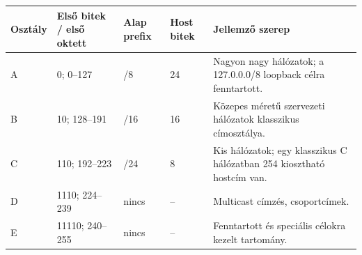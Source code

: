 \begin{tabularx}{\textwidth}{L{13mm}L{29mm}L{21mm}L{19mm}X}
\toprule
\textbf{Osztály} & \textbf{Első bitek / első oktett} & \textbf{Alap prefix} & \textbf{Host bitek} & \textbf{Jellemző szerep} \\
\midrule
A & 0; 0--127 & /8 & 24 & Nagyon nagy hálózatok; a 127.0.0.0/8 loopback célra fenntartott. \\
B & 10; 128--191 & /16 & 16 & Közepes méretű szervezeti hálózatok klasszikus címosztálya. \\
C & 110; 192--223 & /24 & 8 & Kis hálózatok; egy klasszikus C hálózatban 254 kiosztható hostcím van. \\
D & 1110; 224--239 & nincs & -- & Multicast címzés, csoportcímek. \\
E & 11110; 240--255 & nincs & -- & Fenntartott és speciális célokra kezelt tartomány. \\
\bottomrule
\end{tabularx}
